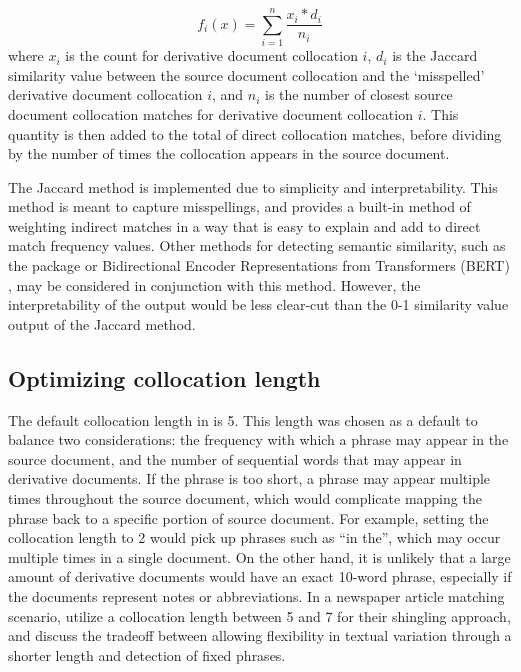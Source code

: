 \begin{equation}
f_{i}(x) = \sum_{i=1}^n\frac{x_i*d_i}{n_i}
\label{eq:fuzzyeq}
  \end{equation}
where \(x_i\) is the count for derivative document collocation \(i\), \(d_i\) is the Jaccard similarity value between the source document collocation and the `misspelled' derivative document collocation \(i\), and \(n_i\) is the number of closest source document collocation matches for derivative document collocation \(i\).
This quantity is then added to the total of direct collocation matches, before dividing by the number of times the collocation appears in the source document.

The Jaccard method is implemented due to simplicity and interpretability.
This method is meant to capture misspellings, and provides a built-in method of weighting indirect matches in a way that is easy to explain and add to direct match frequency values.
Other methods for detecting semantic similarity, such as the  package \citep{word2vec} or Bidirectional Encoder Representations from Transformers (BERT) \citep{devlin-etal-2019-bert}, may be considered in conjunction with this method.
However, the interpretability of the output would be less clear-cut than the 0-1 similarity value output of the Jaccard method.

\subsection{Optimizing collocation length}\label{optimizing-collocation-length}

The default collocation length in  is 5.
This length was chosen as a default to balance two considerations: the frequency with which a phrase may appear in the source document, and the number of sequential words that may appear in derivative documents.
If the phrase is too short, a phrase may appear multiple times throughout the source document, which would complicate mapping the phrase back to a specific portion of source document.
For example, setting the collocation length to 2 would pick up phrases such as ``in the'', which may occur multiple times in a single document.
On the other hand, it is unlikely that a large amount of derivative documents would have an exact 10-word phrase, especially if the documents represent notes or abbreviations.
In a newspaper article matching scenario, \citet{smith_infectious_2013} utilize a collocation length between 5 and 7 for their shingling approach, and discuss the tradeoff between allowing flexibility in textual variation through a shorter length and detection of fixed phrases.


